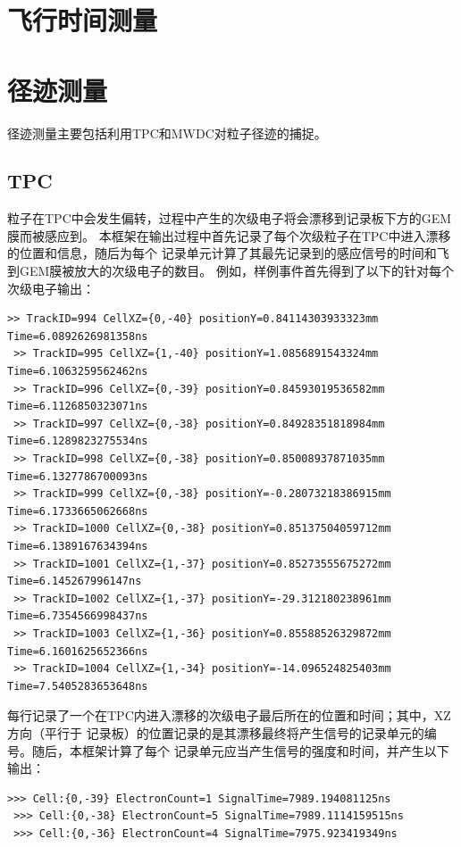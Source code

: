 \documentclass[bachelor,openany,oneside,color]{buaathesis}
\begin{document}
\section{飞行时间测量}%

\section{径迹测量}

径迹测量主要包括利用TPC和MWDC对粒子径迹的捕捉。

\subsection{TPC}

粒子在TPC中会发生偏转，过程中产生的次级电子将会漂移到记录板下方的GEM膜而被感应到。
本框架在输出过程中首先记录了每个次级粒子在TPC中进入漂移的位置和信息，随后为每个
记录单元计算了其最先记录到的感应信号的时间和飞到GEM膜被放大的次级电子的数目。
例如，样例事件首先得到了以下的针对每个次级电子输出：

\begin{lstlisting}[firstnumber=2527,lastline=2537]
 >> TrackID=994 CellXZ={0,-40} positionY=0.84114303933323mm Time=6.0892626981358ns
 >> TrackID=995 CellXZ={1,-40} positionY=1.0856891543324mm Time=6.1063259562462ns
 >> TrackID=996 CellXZ={0,-39} positionY=0.84593019536582mm Time=6.1126850323071ns
 >> TrackID=997 CellXZ={0,-38} positionY=0.84928351818984mm Time=6.1289823275534ns
 >> TrackID=998 CellXZ={0,-38} positionY=0.85008937871035mm Time=6.1327786700093ns
 >> TrackID=999 CellXZ={0,-38} positionY=-0.28073218386915mm Time=6.1733665062668ns
 >> TrackID=1000 CellXZ={0,-38} positionY=0.85137504059712mm Time=6.1389167634394ns
 >> TrackID=1001 CellXZ={1,-37} positionY=0.85273555675272mm Time=6.145267996147ns
 >> TrackID=1002 CellXZ={1,-37} positionY=-29.312180238961mm Time=6.7354566998437ns
 >> TrackID=1003 CellXZ={1,-36} positionY=0.85588526329872mm Time=6.1601625652366ns
 >> TrackID=1004 CellXZ={1,-34} positionY=-14.096524825403mm Time=7.5405283653648ns
\end{lstlisting}

每行记录了一个在TPC内进入漂移的次级电子最后所在的位置和时间；其中，XZ方向（平行于
记录板）的位置记录的是其漂移最终将产生信号的记录单元的编号。随后，本框架计算了每个
记录单元应当产生信号的强度和时间，并产生以下输出：

\begin{lstlisting}[firstnumber=3322,lastline=3324]
 >>> Cell:{0,-39} ElectronCount=1 SignalTime=7989.194081125ns
 >>> Cell:{0,-38} ElectronCount=5 SignalTime=7989.1114159515ns
 >>> Cell:{0,-36} ElectronCount=4 SignalTime=7975.923419349ns
\end{lstlisting}
\end{document}

